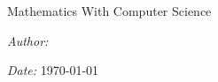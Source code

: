 \documentclass[oneside]{book}
\begin{document}
\begin{titlepage}
    \vspace*{1.5cm} %
    
    {\Huge \bfseries \thetitle \par}
    
    {\Large \color{gray!60} Mathematics With Computer Science \par}
    
    \vfill
    
    {\Large \textit{Author:} \theauthor \par}
    
    {\Large \textit{Date:} \today \par}
    
    \vspace*{1cm}
\end{titlepage}

\pagestyle{plain}
\tableofcontents






\end{document}
